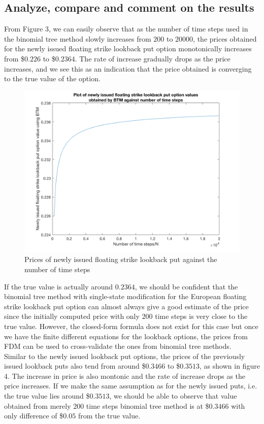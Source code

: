 \subsection{Analyze, compare and comment on the results}
From Figure 3, we can easily observe that as the number of time steps used in the binomial tree method slowly increases from $200$ to $20000$, the prices obtained for the newly issued floating strike lookback put option monotonically increases from \$$0.226$ to \$$0.2364$. The rate of increase gradually drops as the price increases, and we see this as an indication that the price obtained is converging to the true value of the option.\\[4mm]
\begin{figure}[h]
	\centering
	\includegraphics[scale=0.3]{A2_ni.PNG}
	\caption{Prices of newly issued floating strike lookback put against the number of time steps}
\end{figure}
If the true value is actually around $0.2364$, we should be confident that the binomial tree method with single-state modification for the European floating strike lookback put option can almost always give a good estimate of the price since the initially computed price with only $200$ time steps is very close to the true value. However, the closed-form formula does not exist for this case but once we have the finite different equations for the lookback options, the prices from FDM can be used to cross-validate the ones from binomial tree methods.\\[4mm]
Similar to the newly issued lookback put options, the prices of the previously issued lookback puts also tend from around \$$0.3466$ to \$$0.3513$, as shown in figure 4. The increase in price is also montonic and the rate of increase drops as the price increases. If we make the same assumption as for the newly issued puts, i.e. the true value lies around \$$0.3513$, we should be able to observe that value obtained from merely $200$ time steps binomial tree method is at \$$0.3466$ with only difference of \$$0.05$ from the true value.\\[4mm]
